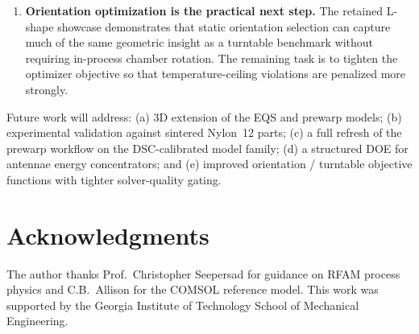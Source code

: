 \documentclass[5p,times]{elsarticle}
\begin{document}
\begin{enumerate}
\item \textbf{Orientation optimization is the practical next step.}
      The retained L-shape showcase demonstrates that static orientation
      selection can capture much of the same geometric insight as a
      turntable benchmark without requiring in-process chamber
      rotation.  The remaining task is to tighten the optimizer
      objective so that temperature-ceiling violations are penalized
      more strongly.

\end{enumerate}

Future work will address: (a) 3D extension of the EQS and prewarp
models; (b) experimental validation against sintered Nylon~12 parts;
(c) a full refresh of the prewarp workflow on the DSC-calibrated model
family; (d) a structured DOE for antennae energy concentrators; and
(e) improved orientation / turntable objective functions with tighter
solver-quality gating.

\section*{Acknowledgments}

The author thanks Prof.\ Christopher Seepersad for guidance on RFAM
process physics and C.B.\ Allison for the COMSOL reference model.
This work was supported by the Georgia Institute of Technology School
of Mechanical Engineering.



\end{document}
